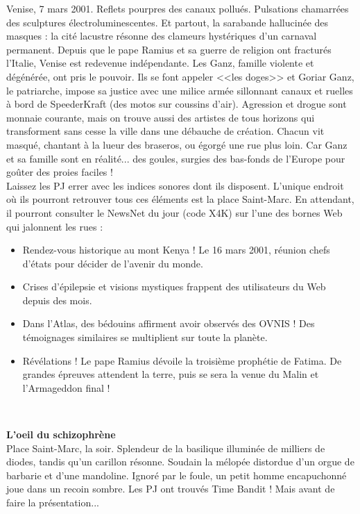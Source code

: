 \documentclass[11pt,twoside,a4paper]{book}
\begin{document}
Venise, 7 mars 2001. Reflets pourpres des canaux pollu{\'e}s. Pulsations chamarr{\'e}es des sculptures {\'e}lectroluminescentes. Et partout, la sarabande hallucin{\'e}e des masques : la cit{\'e} lacustre r{\'e}sonne des clameurs hyst{\'e}riques d'un carnaval permanent. Depuis que le pape Ramius et sa guerre de religion ont fractur{\'e}s l'Italie, Venise est redevenue ind{\'e}pendante. Les Ganz, famille violente et d{\'e}g{\'e}n{\'e}r{\'e}e, ont pris le pouvoir. Ils se font appeler <<les doges>> et Goriar Ganz, le patriarche, impose sa justice avec une milice arm{\'e}e sillonnant canaux et ruelles {\`a} bord de SpeederKraft (des motos sur coussins d'air). Agression et drogue sont monnaie courante, mais on trouve aussi des artistes de tous horizons qui transforment sans cesse la ville dans une d{\'e}bauche de cr{\'e}ation. Chacun vit masqu{\'e}, chantant {\`a} la lueur des braseros, ou {\'e}gorg{\'e} une rue plus loin. Car Ganz et sa famille sont en r{\'e}alit{\'e}... des goules, surgies des bas-fonds de l'Europe pour go{\^u}ter des proies faciles !~\\

Laissez les PJ errer avec les indices sonores dont ils disposent. L'unique endroit o{\`u} ils pourront retrouver tous ces {\'e}l{\'e}ments est la place Saint-Marc. En attendant, il pourront consulter le NewsNet du jour (code X4K) sur l'une des bornes Web qui jalonnent les rues :
\setlength\parindent{20pt}
\begin{itemize}
	\item Rendez-vous historique au mont Kenya ! Le 16 mars 2001, r{\'e}union chefs d'{\'e}tats pour d{\'e}cider de l'avenir du monde.
	\item Crises d'{\'e}pilepsie et visions mystiques frappent des utilisateurs du Web depuis des mois.
	\item Dans l'Atlas, des b{\'e}douins affirment avoir observ{\'e}s des OVNIS ! Des t{\'e}moignages similaires se multiplient sur toute la plan{\`e}te.
	\item R{\'e}v{\'e}lations ! Le pape Ramius d{\'e}voile la troisi{\`e}me proph{\'e}tie de Fatima. De grandes {\'e}preuves attendent la terre, puis se sera la venue du Malin et l'Armageddon final !
\end{itemize}~\\
\setlength\parindent{0pt}

\textbf{\large L'oeil du schizophr{\`e}ne}~\\

Place Saint-Marc, la soir. Splendeur de la basilique illumin{\'e}e de milliers de diodes, tandis qu'un carillon r{\'e}sonne. Soudain la m{\'e}lop{\'e}e distordue d'un orgue de barbarie et d'une mandoline. Ignor{\'e} par le foule, un petit homme encapuchonn{\'e} joue dans un recoin sombre. Les PJ ont trouv{\'e}s Time Bandit ! Mais avant de faire la pr{\'e}sentation...~\\
\end{document}
